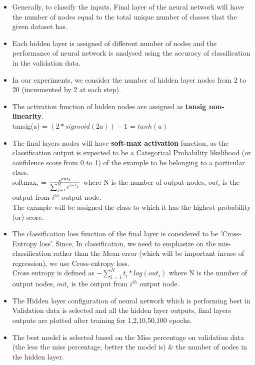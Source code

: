 \documentclass[fleqn]{article}
\begin{document}
\begin{itemize}
\item Generally, to classify the inputs, Final layer of the neural network will have the number of nodes equal to the total unique number of classes that the given dataset has. 
\item Each hidden layer is assigned of different number of nodes and the performance of neural network is analysed using the accuracy of classification in the validation data. 
\item In our experiments, we consider the number of hidden layer nodes from 2 to 20 (incremented by 2 at each step).

\item The activation function of hidden nodes are assigned as \textbf{tansig non-linearity}.\\
tansig(a) = $(2 * sigmoid(2a)) - 1$ = $tanh(a)$
\item The final layers nodes will have \textbf{soft-max activation} function, as the classification output is expected to be a Categorical Probability likelihood (or confidence score from 0 to 1) of the example to be belonging to a particular class.\\
softmax$_i$ = ${e^{out_i}} \over \sum_{j=1}^N{e^{out_j}}$ where N is the number of output nodes, $out_i$ is the output from $i^{th}$ output node.\\
The example will be assigned the class to which it has the highest probability (or) score.

\item The classification loss function of the final layer is considered to be 'Cross-Entropy loss'. Since, In classification, we need to emphasize on the mis-classification rather than the Mean-error (which will be important incase of regression), we use Cross-entropy loss.\\
Cross entropy is defined as $-\sum_{i=1}^N{t_i*log(out_i)}$ where N is the number of output nodes, $out_i$ is the output from $i^{th}$ output node.

\item The Hidden layer configuration of neural network which is performing best in Validation data is selected and all the hidden layer outputs, final layers outputs are plotted after training for {1,2,10,50,100} epochs.
\item The best model is selected based on the Miss percentage on validation data (the less the miss percentage, better the model is) \& the number of nodes in the hidden layer. 
\end{itemize}
\end{document}
